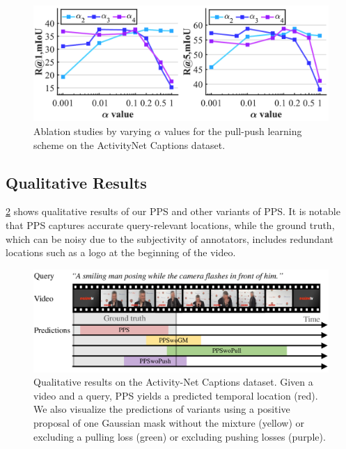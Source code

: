 \begin{figure}[t!]
  \centering
    \includegraphics[width=\linewidth]{figures/3-ablation-graph-alpha.pdf}
    \caption{Ablation studies by varying $\alpha$ values for the pull-push learning scheme on the ActivityNet Captions dataset.
    }
    \label{fig:ablation-graph-alpha}
\end{figure}

\subsection{Qualitative Results}
\label{sec:qualitative-results}

\cref{fig:qualitative} shows qualitative results of our PPS and other variants of PPS.
It is notable that PPS captures accurate query-relevant locations, while the ground truth, which can be noisy due to the subjectivity of annotators, includes redundant locations such as a logo at the beginning of the video.


\begin{figure}[t]
  \centering
  \includegraphics[width=\linewidth]{figures/4-qualitative.pdf}
  \caption{
  Qualitative results on the Activity-Net Captions dataset.
  Given a video and a query, PPS yields a predicted temporal location (red).
  We also visualize the predictions of variants using a positive proposal of one Gaussian mask without the mixture (yellow) or excluding a pulling loss (green) or excluding pushing losses (purple).
  }
\label{fig:qualitative}
\end{figure}